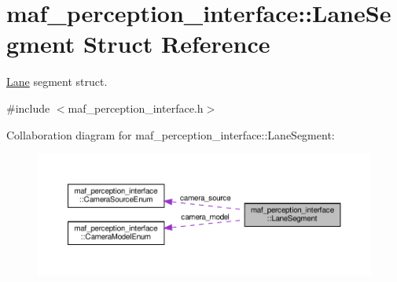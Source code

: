 \hypertarget{structmaf__perception__interface_1_1LaneSegment}{}\section{maf\+\_\+perception\+\_\+interface\+:\+:Lane\+Segment Struct Reference}
\label{structmaf__perception__interface_1_1LaneSegment}


\hyperlink{structmaf__perception__interface_1_1Lane}{Lane} segment struct.  




{\ttfamily \#include $<$maf\+\_\+perception\+\_\+interface.\+h$>$}



Collaboration diagram for maf\+\_\+perception\+\_\+interface\+:\+:Lane\+Segment\+:\nopagebreak
\begin{figure}[H]
\begin{center}
\leavevmode
\includegraphics[width=350pt]{structmaf__perception__interface_1_1LaneSegment__coll__graph}
\end{center}
\end{figure}
